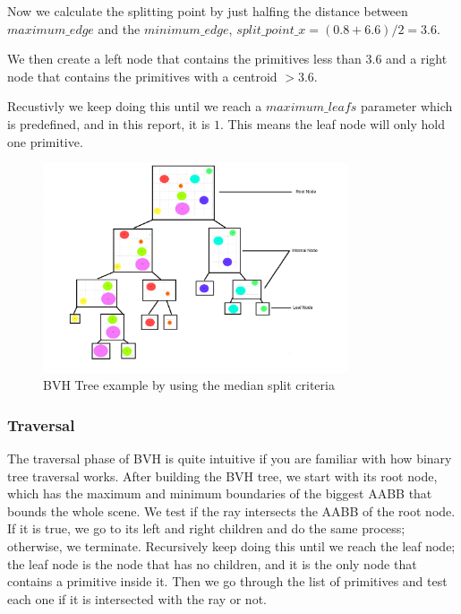 \documentclass[11pt,a4paper]{article}
\begin{document}
Now we calculate the splitting point by just halfing the distance between $maximum\_edge $ and the $minimum\_edge$, $split\_point\_x = (0.8+6.6) / 2 = 3.6$.
\\
\noindent

We then create a left node that contains the primitives less than 3.6 and a right node that contains the primitives with a centroid $ > 3.6$. 
\\
\noindent

Recustivly we keep doing this until we reach a $maximum\_leafs$ parameter which is predefined, and in this report, it is $1$. This means the leaf node will only hold one primitive. 


\begin{figure}[h]	
     \centering
     \captionsetup{justification=centering,margin=2cm}
     \includegraphics[width=9cm]{images/example_bvh/tree.png}
     \caption{BVH Tree example by using the median split criteria}
     \label{fig:dice}
\end{figure}
\clearpage


\subsubsection{Traversal}
 The traversal phase of BVH is quite intuitive if you are familiar with how binary tree traversal works. After building the BVH tree, we start with its root node, which has the maximum and minimum boundaries of the biggest AABB that bounds the whole scene. We test if the ray intersects the AABB of the root node. If it is true, we go to its left and right children and do the same process; otherwise, we terminate. Recursively keep doing this until we reach the leaf node; the leaf node is the node that has no children, and it is the only node that contains a primitive inside it. Then we go through the list of primitives and test each one if it is intersected with the ray or not. 
\\
\noindent
\end{document}
